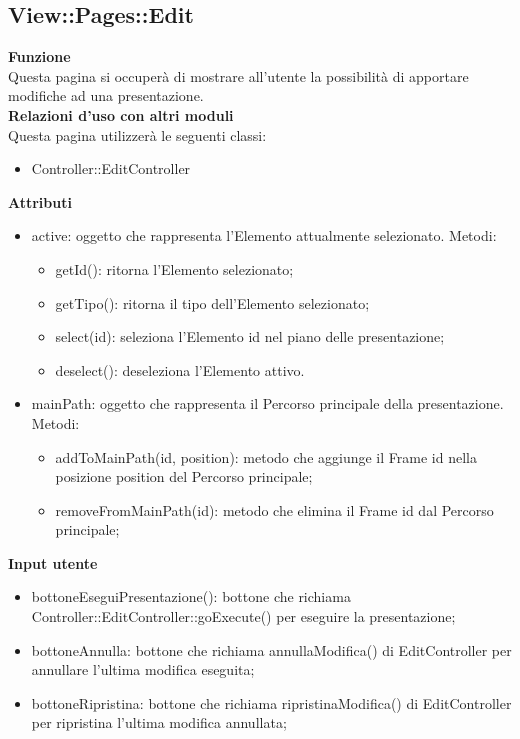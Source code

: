 {\subsection{View::Pages::Edit}{
	\textbf{Funzione}\\
	\indent Questa pagina si occuperà di mostrare all'utente la possibilità di apportare modifiche ad una presentazione.\\
	\textbf{Relazioni d'uso con altri moduli}\\
	\indent Questa pagina utilizzerà le seguenti classi:
	\begin{itemize}
		\item Controller::EditController
	\end{itemize}
	\textbf{Attributi}\\
		\begin{itemize}
			\item active: oggetto che rappresenta l'Elemento attualmente selezionato. Metodi:
			\begin{itemize}
				\item getId(): ritorna l'Elemento selezionato;
				\item getTipo(): ritorna il tipo dell'Elemento selezionato;
				\item select(id): seleziona l'Elemento id nel piano delle presentazione;
				\item deselect(): deseleziona l'Elemento attivo.
			\end{itemize}
			\item mainPath: oggetto che rappresenta il Percorso principale della presentazione. Metodi:
			\begin{itemize}
				\item addToMainPath(id, position): metodo che aggiunge il Frame id nella posizione position del Percorso principale;
				\item removeFromMainPath(id): metodo che elimina il Frame\ped{g} id dal Percorso principale;
			\end{itemize}
		\end{itemize}
	\textbf{Input utente}
	\begin{itemize}
		\item bottoneEseguiPresentazione(): bottone che richiama Controller::EditController::goExecute() per eseguire la presentazione;
		\item bottoneAnnulla: bottone che richiama annullaModifica() di EditController per annullare l'ultima modifica eseguita;
		\item bottoneRipristina: bottone che richiama ripristinaModifica() di EditController per ripristina l'ultima modifica annullata;

\end{itemize}}}
